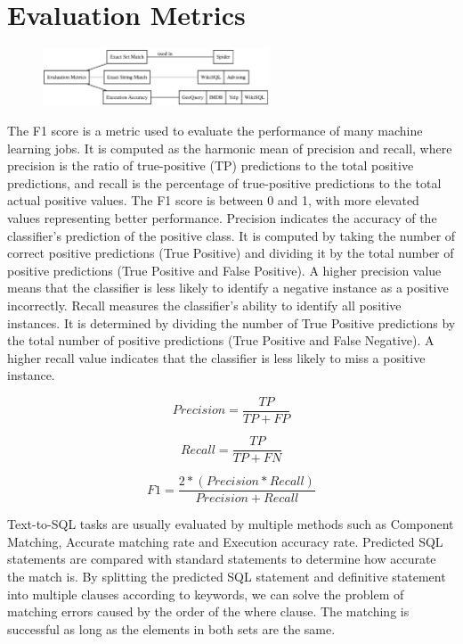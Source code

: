 \section{Evaluation Metrics} \label{eval}

\begin{figure}[htb]
    \centering
    \includegraphics[width=0.6\textwidth]{pics/mindmap/eval/eval.eps}
    \label{fig:evals}
\end{figure}


The F1 score is a metric used to evaluate the performance of many machine learning jobs. It is computed as the harmonic mean of precision and recall, where precision is the ratio of true-positive (TP) predictions to the total positive predictions, and recall is the percentage of true-positive predictions to the total actual positive values. The F1 score is between 0 and 1, with more elevated values representing better performance.
Precision indicates the accuracy of the classifier's prediction of the positive class. It is computed by taking the number of correct positive predictions (True Positive) and dividing it by the total number of positive predictions (True Positive and False Positive). A higher precision value means that the classifier is less likely to identify a negative instance as a positive incorrectly.
Recall measures the classifier's ability to identify all positive instances. It is determined by dividing the number of True Positive predictions by the total number of positive predictions (True Positive and False Negative). A higher recall value indicates that the classifier is less likely to miss a positive instance.

\begin{equation}
    Precision = \frac{TP}{TP + FP}
\end{equation}

\begin{equation}
    Recall = \frac{TP}{TP + FN}
\end{equation}

\begin{equation}
    F1 = \frac{2 * (Precision * Recall)}{Precision + Recall}
\end{equation}

Text-to-SQL tasks are usually evaluated by multiple methods such as Component Matching, Accurate matching rate and Execution accuracy rate. Predicted SQL statements are compared with standard statements to determine how accurate the match is.
By splitting the predicted SQL statement and definitive statement into multiple clauses according to keywords, we can solve the problem of matching errors caused by the order of the where clause. The matching is successful as long as the elements in both sets are the same.

